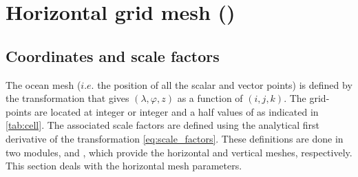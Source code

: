 \documentclass[../tex_main/NEMO_manual]{subfiles}
\begin{document}
\section{Horizontal grid mesh (\protect{})}
\label{sec:DOM_hgr}

\subsection{Coordinates and scale factors}
\label{subsec:DOM_hgr_coord_e}

The ocean mesh ($i.e.$ the position of all the scalar and vector points) is defined 
by the transformation that gives $(\lambda,\varphi,z)$ as a function of $(i,j,k)$. 
The grid-points are located at integer or integer and a half values of as indicated 
in \autoref{tab:cell}. The associated scale factors are defined using the 
analytical first derivative of the transformation \autoref{eq:scale_factors}. These 
definitions are done in two modules,  and , which 
provide the horizontal and vertical meshes, respectively. This section deals with 
the horizontal mesh parameters.
\end{document}
